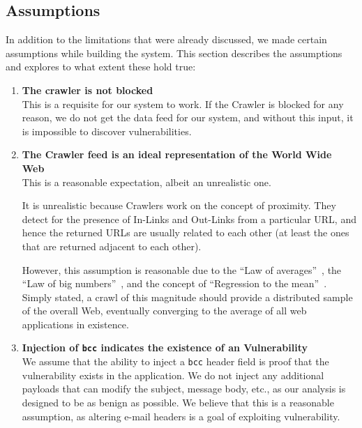 \subsection{Assumptions}
In addition to the limitations that were already discussed, we made certain assumptions while building the system. This section describes the assumptions and explores to what extent these hold true:
\begin{enumerate}
	\item \textbf{The crawler is not blocked}\\
	This is a requisite for our system to work. If the Crawler is blocked for any reason, we do not get the data feed for our system, and without this input, it is impossible to discover vulnerabilities. 
	
	\item \textbf{The Crawler feed is an ideal representation of the World Wide Web} \\

      
	This is a reasonable expectation, albeit an unrealistic one.
	
	It is unrealistic because Crawlers work on the concept of proximity. They detect for the presence of In-Links and Out-Links from a particular URL, and hence the returned URLs are usually related to each other (at least the ones that are returned adjacent to each other).
	
	However, this assumption is reasonable due to the ``Law of averages''~\cite{wiki:Law_of_averages}, the ``Law of big numbers''~\cite{wiki:Law_of_large_numbers}, and the concept of ``Regression to the mean''~\cite{wiki:Regression_toward_the_mean}. Simply stated, a crawl of this magnitude should provide a distributed sample of the overall Web, eventually converging to the average of all web applications in existence.
	
	\item \textbf{Injection of \texttt{bcc} indicates the existence of an \ehi Vulnerability} \\
	We assume that the ability to inject a \texttt{bcc} header field is proof that the \ehi vulnerability exists in the application. We do not inject any additional payloads that can modify the subject, message body, etc., as our analysis is designed to be as benign as possible.
	We believe that this is a reasonable assumption, as altering e-mail headers is a goal of exploiting \ehi vulnerability.
\end{enumerate}
